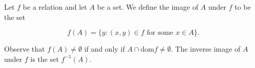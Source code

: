 Let $f$ be a relation and let $A$ be a set. We define the image of $A$ under $f$ to be the set

$$f(A) = \{y : (x, y) \in f \text{ for some } x \in A\}.$$

Observe that $f(A) \neq \emptyset$ if and only if $A \cap \text{dom}f \neq \emptyset$. The inverse image of $A$ under $f$ is the set $f^{-1}(A)$.